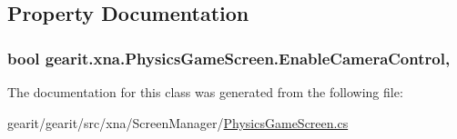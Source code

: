 \subsection{Property Documentation}
\hypertarget{classgearit_1_1xna_1_1_physics_game_screen_af257434a4a106ea94c3cdb9706ce86f1}{
\subsubsection[{Enable\+Camera\+Control}]{\setlength{\rightskip}{0pt plus 5cm}bool gearit.\+xna.\+Physics\+Game\+Screen.\+Enable\+Camera\+Control\hspace{0.3cm}{\ttfamily [get]}, {\ttfamily [set]}}}\label{classgearit_1_1xna_1_1_physics_game_screen_af257434a4a106ea94c3cdb9706ce86f1}


The documentation for this class was generated from the following file\+:\begin{DoxyCompactItemize}
\item 
gearit/gearit/src/xna/\+Screen\+Manager/\hyperlink{_physics_game_screen_8cs}{Physics\+Game\+Screen.\+cs}\end{DoxyCompactItemize}
